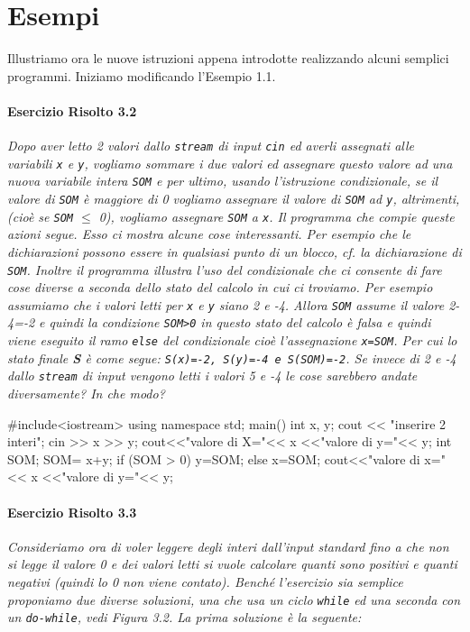 \section{Esempi}
Illustriamo ora le nuove istruzioni appena introdotte realizzando alcuni semplici programmi. Iniziamo modificando l'Esempio 1.1.

\paragraph{Esercizio Risolto 3.2}
\textit{Dopo aver letto 2 valori dallo \texttt{stream} di input \texttt{cin} ed averli assegnati alle variabili \texttt{x} e \texttt{y}, vogliamo sommare i due valori ed assegnare questo valore ad una nuova variabile intera \texttt{SOM} e per ultimo, usando l'istruzione condizionale, se il valore di \texttt{SOM} è maggiore di 0 vogliamo assegnare il valore di \texttt{SOM} ad \texttt{y}, altrimenti, (cioè se \texttt{SOM} $\le$ 0), vogliamo assegnare \texttt{SOM} a \texttt{x}.
Il programma che compie queste azioni segue. Esso ci mostra alcune cose interessanti.
Per esempio che le dichiarazioni possono essere in qualsiasi punto di un blocco, cf. la dichiarazione di \texttt{SOM}.
Inoltre il programma illustra l'uso del condizionale che ci consente di fare cose diverse a seconda dello stato del calcolo in cui ci troviamo.
Per esempio assumiamo che i valori letti per \texttt{x} e \texttt{y} siano 2 e -4. Allora \texttt{SOM} assume il valore 2-4=-2 e quindi la condizione \texttt{SOM>0} in questo stato del calcolo è falsa e quindi viene eseguito il ramo \texttt{else} del condizionale cioè l'assegnazione \texttt{x=SOM}.
Per cui lo stato finale \textbf{S} è come segue: \texttt{S(x)=-2, S(y)=-4 e S(SOM)=-2}.
Se invece di 2 e -4 dallo \texttt{stream} di input vengono letti i valori 5 e -4 le cose sarebbero andate diversamente? In che modo?}

\begin{codice}

#include<iostream> 
using namespace std; 
main() {
  int x, y; 
  cout << "inserire 2 interi"; 
  cin >> x >> y; 
  cout<<"valore di X="<< x <<"valore di y="<< y;
  int SOM; 
  SOM= x+y; 
  if (SOM > 0) 
    y=SOM;
  else
    x=SOM;
  cout<<"valore di x="<< x <<"valore di y="<< y;
}
\end{codice}

\paragraph{Esercizio Risolto 3.3}
\textit{Consideriamo ora di voler leggere degli interi dall'input standard fino a che non si legge il valore 0 e dei valori letti si vuole calcolare quanti sono positivi e quanti negativi (quindi lo 0 non viene contato).
Benché l'esercizio sia semplice proponiamo due diverse soluzioni, una che usa un ciclo \texttt{while} ed una seconda con un \texttt{do-while}, vedi Figura 3.2.
La prima soluzione è la seguente:}

